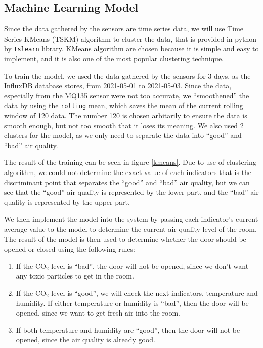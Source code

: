 \subsection{Machine Learning Model}
Since the data gathered by the sensors are time
series data, we will use Time Series KMeans (TSKM)
algorithm to cluster the data, that is provided in
python by
\href{https://tslearn.readthedocs.io/en/stable/}{\texttt{tslearn}} library.
KMeans algorithm are chosen because it is simple and
easy to implement, and it is also one of the most
popular clustering technique.

To train the model, we used the data gathered by the
sensors for 3 days, as the InfluxDB database stores,
from 2021-05-01 to 2021-05-03. Since the data,
especially from the MQ135 sensor were not too
accurate, we ``smoothened'' the data by using the
\href{https://pandas.pydata.org/docs/reference/api/pandas.DataFrame.rolling.html}{\texttt{rolling}} mean, which saves
the mean of the current rolling window of 120 data. The number
120 is chosen arbitarily to ensure the data is smooth enough,
but not too smooth that it loses its meaning. We also used 2
clusters for the model, as we only need to separate the data
into ``good'' and ``bad'' air quality.

The result of the training can be seen in
figure \ref{kmeans}. Due to use of clustering algorithm, we could not
determine the exact value of each indicators that is the
discriminant point that separates the ``good'' and ``bad''
air quality, but we can see that the ``good'' air quality is
represented by the lower part, and the ``bad'' air quality is
represented by the upper part.

We then implement the model into the system by passing each
indicator's current average value to the model to determine
the current air quality level of the room. The result of the
model is then used to determine whether the door should be
opened or closed using the following rules:
\begin{enumerate}
      \item If the CO$_2$ level is ``bad'', the door will not be
            opened, since we don't want any toxic particles to
            get in the room.
      \item If the CO$_2$ level is ``good'', we will check the
            next indicators, temperature and humidity. If
            either temperature or humidity is ``bad'', then the
            door will be opened, since we want to get fresh
            air into the room.
      \item If both temperature and humidity are ``good'',
            then the door will not be opened, since the air
            quality is already good.
\end{enumerate}

